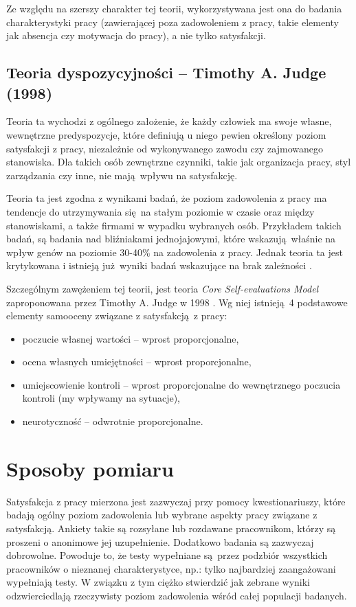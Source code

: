 Ze względu na szerszy charakter tej teorii, wykorzystywana jest ona do badania charakterystyki pracy (zawierającej poza zadowoleniem z pracy, takie elementy jak absencja czy motywacja do pracy), a nie tylko satysfakcji.

\subsection{Teoria dyspozycyjności -- Timothy A. Judge (1998)}
Teoria ta wychodzi z ogólnego założenie, że każdy człowiek ma swoje własne, wewnętrzne predyspozycje, które definiują u niego pewien określony poziom satysfakcji z pracy, niezależnie od wykonywanego zawodu czy zajmowanego stanowiska. Dla takich osób zewnętrzne czynniki, takie jak organizacja pracy, styl zarządzania czy inne, nie mają wpływu na satysfakcję.

Teoria ta jest zgodna z wynikami badań, że poziom zadowolenia z pracy ma tendencje do utrzymywania się na stałym poziomie w czasie oraz między stanowiskami, a także firmami w wypadku wybranych osób. Przykładem takich badań, są badania nad bliźniakami jednojajowymi, które wskazują właśnie na wpływ genów na poziomie 30-40\%  na zadowolenia z pracy. Jednak teoria ta jest krytykowana i istnieją już wyniki badań wskazujące na brak zależności \cite{schultz1985family}.

Szczególnym zawężeniem tej teorii, jest teoria \emph{Core Self-evaluations Model} zaproponowana przez Timothy A. Judge w 1998 \cite{judge1998dispositional,judge2001relationship}. Wg niej istnieją 4 podstawowe elementy samooceny związane z satysfakcją z pracy:
\begin{itemize}
\item poczucie własnej wartości -- wprost proporcjonalne,
\item ocena własnych umiejętności -- wprost proporcjonalne,
\item umiejscowienie kontroli -- wprost proporcjonalne do wewnętrznego poczucia kontroli (my wpływamy na sytuacje),
\item neurotyczność -- odwrotnie proporcjonalne.
\end{itemize}


\section{Sposoby pomiaru}
Satysfakcja z pracy mierzona jest zazwyczaj przy pomocy kwestionariuszy, które badają ogólny poziom zadowolenia lub wybrane aspekty pracy związane z satysfakcją. Ankiety takie są rozsyłane lub rozdawane pracownikom, którzy są proszeni o anonimowe jej uzupełnienie. Dodatkowo badania są zazwyczaj dobrowolne. Powoduje to, że testy wypełniane są przez podzbiór wszystkich pracowników o nieznanej charakterystyce, np.: tylko najbardziej zaangażowani wypełniają testy. W
związku z tym ciężko stwierdzić jak zebrane wyniki odzwierciedlają rzeczywisty poziom zadowolenia wśród całej populacji badanych.

